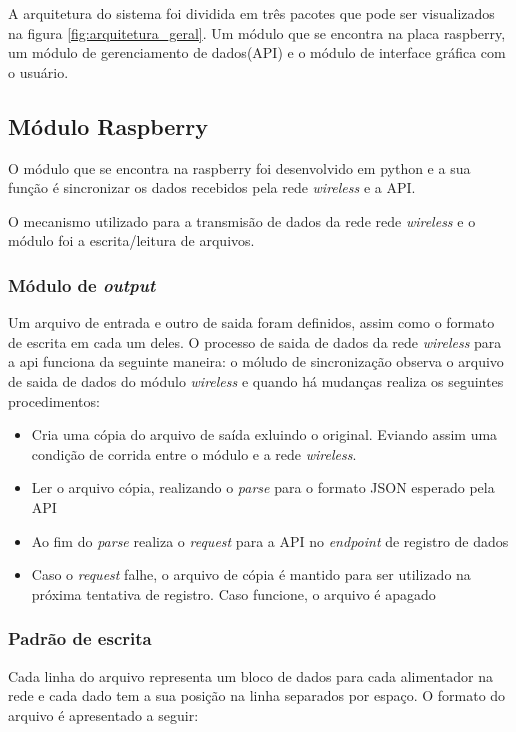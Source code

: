 A arquitetura do sistema foi dividida em três pacotes que pode ser visualizados na figura \ref{fig:arquitetura_geral}. Um módulo que se encontra na placa raspberry, um módulo de gerenciamento de dados(API) e o módulo de interface gráfica com o usuário.

\subsection{Módulo Raspberry}

O módulo que se encontra na raspberry foi desenvolvido em python e a sua função é sincronizar os dados recebidos pela rede \textit{wireless} e a API.

O mecanismo utilizado para a transmisão de dados da rede rede \textit{wireless} e o módulo foi a escrita/leitura de arquivos.

\subsubsection{Módulo de \textit{output}}
Um arquivo de entrada e outro de saida foram definidos, assim como o formato de escrita em cada um deles. O processo de saida de dados da rede \textit{wireless} para a api funciona da seguinte maneira: o móludo de sincronização observa o arquivo de saida de dados do módulo \textit{wireless} e quando há mudanças realiza os seguintes procedimentos:

\begin{itemize}
  \item Cria uma cópia do arquivo de saída exluindo o original. Eviando assim uma condição de corrida entre o módulo e a rede \textit{wireless}.
  \item Ler o arquivo cópia, realizando o \textit{parse} para o formato JSON esperado pela API
  \item Ao fim do \textit{parse} realiza o \textit{request} para a API no \textit{endpoint} de registro de dados
  \item Caso o \textit{request} falhe, o arquivo de cópia é mantido para ser utilizado na próxima tentativa de registro. Caso funcione, o arquivo é apagado
\end{itemize}

\subsubsection{Padrão de escrita}

Cada linha do arquivo representa um bloco de dados para cada alimentador na rede e cada dado tem a sua posição na linha separados por espaço. O formato do arquivo é apresentado a seguir:\\


